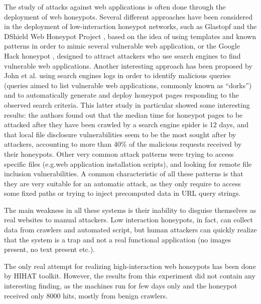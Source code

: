 The study of attacks against web applications is often done through the deployment of web honeypots. Several different approaches have been considered in the deployment of low-interaction honeypot networks, such as Glastopf \cite{glastopf} and the DShield Web Honeypot Project \cite{dswhp}, based on the idea of using templates and known patterns in order to mimic several vulnerable web application, or the Google Hack honeypot \cite{googleHoney}, designed to attract attackers who use search engines to find vulnerable web applications. Another interesting approach has been proposed by John et al. \cite{johnhsh} using search engines logs in order to identify malicious queries (queries aimed to list vulnerable web applications, commonly known as ``dorks'') and to automatically generate and deploy honeypot pages responding to the observed search criteria. This latter study in particular showed some interesting results: the authors found out that the median time for honeypot pages to be attacked after they have been crawled by a search engine spider is 12 days, and that local file disclosure vulnerabilities seem to be the most sought after by attackers, accounting to more than 40\% of the malicious requests received by their honeypots. Other very common attack patterns were trying to access specific files (e.g.web application installation scripts), and looking for remote file inclusion vulnerabilities. A common characteristic of all these patterns is that they are very suitable for an automatic attack, as they only require to access some fixed paths or trying to inject precomputed data in URL query strings.

The main weakness in all these systems is their inability to disguise themselves as real websites to manual attackers. Low interaction honeypots, in fact, can collect data from crawlers and automated script, but human attackers can quickly realize that the system is a trap and not a real functional application (no images present, no text present etc.).

The only real attempt for realizing high-interaction web honeypots has been done by HIHAT \cite{hihat} toolkit. However, the results from this experiment did not contain any interesting finding, as the machines run for few days only and the honeypot received only 8000 hits, mostly from benign crawlers.

